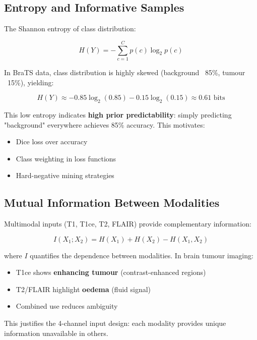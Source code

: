 \documentclass{ecsproject}     %
\begin{document}
\subsection{Entropy and Informative Samples}

The Shannon entropy of class distribution:

\begin{equation}
H(Y) = -\sum_{c=1}^{C} p(c) \log_2 p(c)
\label{Eq:Shannon}
\end{equation}

In BraTS data, class distribution is highly skewed (background ~85\%, tumour ~15\%), yielding:

\begin{equation}
H(Y) \approx -0.85 \log_2(0.85) - 0.15 \log_2(0.15) \approx 0.61 \text{ bits}
\end{equation}

This low entropy indicates \textbf{high prior predictability}: simply predicting "background" everywhere achieves 85\% accuracy. This motivates:
\begin{itemize}
    \item Dice loss over accuracy
    \item Class weighting in loss functions
    \item Hard-negative mining strategies
\end{itemize}

\subsection{Mutual Information Between Modalities}

Multimodal inputs (T1, T1ce, T2, FLAIR) provide complementary information:

\begin{equation}
I(X_1; X_2) = H(X_1) + H(X_2) - H(X_1, X_2)
\label{Eq:MutualInfo}
\end{equation}

where $I$ quantifies the dependence between modalities. In brain tumour imaging:
\begin{itemize}
    \item T1ce shows \textbf{enhancing tumour} (contrast-enhanced regions)
    \item T2/FLAIR highlight \textbf{oedema} (fluid signal)
    \item Combined use reduces ambiguity
\end{itemize}

This justifies the 4-channel input design: each modality provides unique information unavailable in others.
\end{document}
